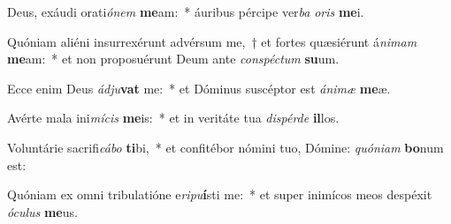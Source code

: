 \item Deus, exáudi orati\textit{ónem} \textbf{me}am:~* áuribus pércipe ver\textit{ba} \textit{oris} \textbf{me}i.
\item Quóniam aliéni insurrexérunt advérsum me,~† et fortes quæsiérunt á\textit{nimam} \textbf{me}am:~* et non proposuérunt Deum ante \textit{conspéctum} \textbf{su}um.
\item Ecce enim Deus \textit{ádju}\textbf{vat} me:~* et Dóminus suscéptor est \textit{ánimæ} \textbf{me}æ.
\item Avérte mala ini\textit{mícis} \textbf{me}is:~* et in veritáte tua \textit{dispérde} \textbf{il}los.
\item Voluntárie sacrifi\textit{cábo} \textbf{ti}bi,~* et confitébor nómini tuo, Dómine: \textit{quóniam} \textbf{bo}num est:
\item Quóniam ex omni tribulatióne e\textit{ripu}\textbf{í}sti me:~* et super inimícos meos despéxit \textit{óculus} \textbf{me}us.
